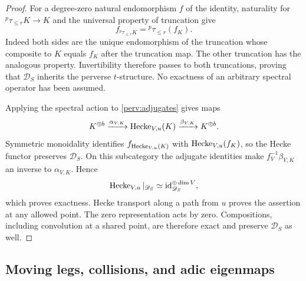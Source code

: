\begin{proof}
For a degree-zero natural endomorphism $f$ of the identity, naturality
for ${}^p\tau_{\le r}K\to K$ and the universal property of truncation give
\[
 f_{{}^p\tau_{\le r}K}={}^p\tau_{\le r}(f_K).
\]
Indeed both sides are the unique endomorphism of the truncation whose
composite to $K$ equals $f_K$ after the truncation map.  The other
truncation has the analogous property.  Invertibility therefore passes
to both truncations, proving that $\mathscr D_S$ inherits the perverse
$t$-structure.  No exactness of an arbitrary spectral operator has been
assumed.

Applying the spectral action to \eqref{perv:adjugates} gives maps
\[
 K^{\oplus b}\xrightarrow{\alpha_{V,K}}\operatorname{Hecke}_{V,u}(K)
                \xrightarrow{\beta_{V,K}}K^{\oplus b}.
\]
Symmetric monoidality identifies $f_{\operatorname{Hecke}_{V,u}(K)}$ with
$\operatorname{Hecke}_{V,u}(f_K)$, so the Hecke functor preserves $\mathscr D_S$.
On this subcategory the adjugate identities make $f_V^{-1}\beta_{V,K}$
an inverse to $\alpha_{V,K}$.  Hence
\begin{equation}\label{perv:fixed-exact}
 \operatorname{Hecke}_{V,u}|_{\mathscr D_S}
          \simeq\operatorname{id}_{\mathscr D_S}^{\oplus\dim V},
\end{equation}
which proves exactness.  Hecke transport along a path from $u$ proves
the assertion at any allowed point.  The zero representation acts by
zero.  Compositions, including convolution at a shared point, are
therefore exact and preserve $\mathscr D_S$ as well.
\end{proof}

\subsection{Moving legs, collisions, and adic eigenmaps}

